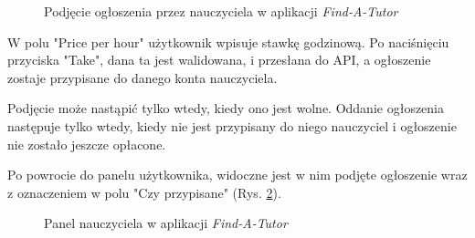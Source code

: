 \documentclass[12pt]{article}
\newcommand{\cmark}{\textcolor{green!80!black}{\ding{51}}}
\numberwithin{figure}{section}
\begin{document}
\begin{sloppypar}
\begin{figure}[!htbp] 
    \centering
    \caption{Podjęcie ogłoszenia przez nauczyciela w aplikacji \textit{Find-A-Tutor}}
    \label{fig:take}
\end{figure}

W polu "Price per hour" użytkownik wpisuje stawkę godzinową. Po naciśnięciu przyciska "Take", dana ta jest walidowana, i przesłana do API, a ogłoszenie zostaje przypisane do danego konta nauczyciela.

Podjęcie może nastąpić tylko wtedy, kiedy ono jest wolne. Oddanie ogłoszenia następuje tylko wtedy, kiedy nie jest przypisany do niego nauczyciel i ogłoszenie nie zostało jeszcze opłacone.

Po powrocie do panelu użytkownika, widoczne jest w nim podjęte ogłoszenie wraz z oznaczeniem \cmark w polu "Czy przypisane" (Rys. \ref{fig:tutor-assigned}).
\begin{figure}[!htbp] 
    \centering
    \caption{Panel nauczyciela w aplikacji \textit{Find-A-Tutor}}
    \label{fig:tutor-assigned}
\end{figure}


\end{sloppypar}
\end{document}
